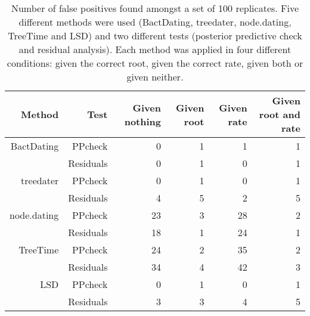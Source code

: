 \begin{table}[ht]
\centering
\begin{tabular}{|r|r|r|r|r|r|}
   \hline
Method & Test & Given nothing & Given root & Given rate & Given root and rate \\ 
   \hline
BactDating & PPcheck & 0 & 1 & 1 & 1 \\ 
   & Residuals & 0 & 1 & 0 & 1 \\ 
  treedater & PPcheck & 0 & 1 & 0 & 1 \\ 
   & Residuals & 4 & 5 & 2 & 5 \\ 
  node.dating & PPcheck & 23 & 3 & 28 & 2 \\ 
   & Residuals & 18 & 1 & 24 & 1 \\ 
  TreeTime & PPcheck & 24 & 2 & 35 & 2 \\ 
   & Residuals & 34 & 4 & 42 & 3 \\ 
  LSD & PPcheck & 0 & 1 & 0 & 1 \\ 
   & Residuals & 3 & 3 & 4 & 5 \\ 
   \hline
\end{tabular}
\caption{Number of false positives found amongst a set of 100 replicates. Five different methods were used (BactDating, treedater, node.dating, TreeTime and LSD)
and two different tests (posterior predictive check and residual analysis). Each method was applied in four different conditions: given the correct root, given the
correct rate, given both or given neither.} 
\label{tab:falsePos}
\end{table}
